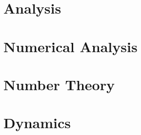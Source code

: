 \documentclass{book}
\theoremstyle{plain}
\theoremstyle{definition}
\numberwithin{equation}{section}
\begin{document}
\part{Analysis}
	
%
% 
%

%
%
%
\part{Numerical Analysis}
%
%
%

\part{Number Theory}

\part{Dynamics}


\end{document}

